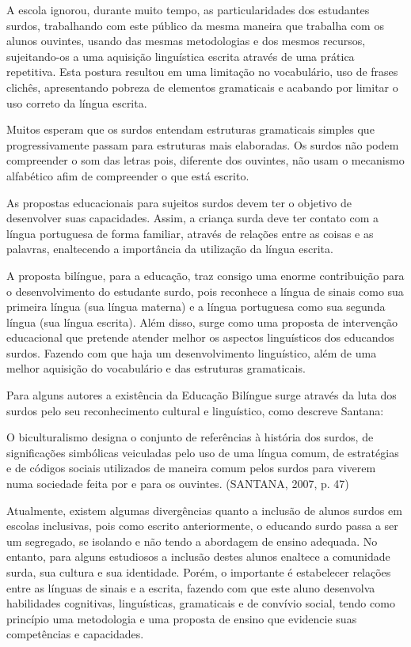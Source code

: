 \documentclass[brasil]{abnt}
\begin{document}
	A escola ignorou, durante muito tempo, as particularidades dos estudantes surdos, trabalhando com este público da mesma maneira que trabalha com os alunos ouvintes, usando das mesmas metodologias e dos mesmos recursos, sujeitando-os a uma aquisição linguística escrita através de uma prática repetitiva.
	Esta postura resultou em uma limitação no vocabulário, uso de frases clichês, apresentando pobreza de elementos gramaticais e acabando por limitar o uso correto da língua escrita. 
	
	Muitos esperam que os surdos entendam estruturas gramaticais simples que progressivamente passam para estruturas mais elaboradas. Os surdos não podem compreender o som das letras pois, diferente dos ouvintes,
	não usam o mecanismo alfabético afim de compreender o que está escrito. 
	
	As propostas educacionais para sujeitos surdos devem ter o objetivo de desenvolver suas capacidades. Assim, a criança surda deve ter contato com a língua portuguesa de forma familiar, através de relações entre as coisas e
	as palavras, enaltecendo a importância da utilização da língua escrita. 
	
	A proposta bilíngue, para a educação, traz consigo uma enorme contribuição para o desenvolvimento do estudante surdo, pois reconhece a língua de sinais como sua primeira língua (sua língua materna) e a língua portuguesa
	como sua segunda língua (sua língua escrita). Além disso, surge como uma proposta de intervenção educacional que pretende atender melhor os aspectos linguísticos dos educandos surdos. Fazendo com que haja um desenvolvimento 
	linguístico, além de uma melhor aquisição do vocabulário e das estruturas gramaticais.		
	
	Para alguns autores a existência da Educação Bilíngue surge através da luta dos surdos pelo seu reconhecimento cultural e linguístico, como descreve Santana:
		
		\begin{citacao} O biculturalismo designa o conjunto de referências à história dos surdos, de significações simbólicas veiculadas pelo uso de uma língua comum, de estratégias e de códigos sociais
						utilizados de maneira comum pelos surdos para viverem numa sociedade feita por e para os ouvintes. (SANTANA, 2007, p. 47)	
		\end{citacao}
				
	Atualmente, existem algumas divergências quanto a inclusão de alunos surdos em escolas inclusivas, pois como escrito anteriormente, o educando surdo passa a ser um segregado, se isolando e não tendo a abordagem de ensino
	adequada. No entanto, para alguns estudiosos a inclusão destes alunos enaltece a comunidade surda, sua cultura e sua identidade. Porém, o importante é estabelecer relações entre as línguas de sinais e a escrita, fazendo com
	que este aluno desenvolva habilidades cognitivas, linguísticas, gramaticais e de convívio social, tendo como princípio uma metodologia e uma proposta de ensino que evidencie suas competências e capacidades.      
	
\end{document}
